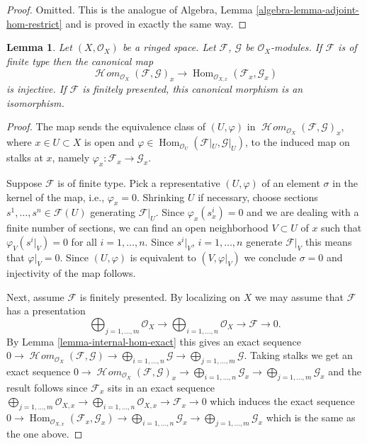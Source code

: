 \documentclass{stacks-project}
\theoremstyle{plain}
\newtheorem{lemma}[subsection]{Lemma}
\theoremstyle{definition}
\theoremstyle{remark}
\numberwithin{equation}{subsection}
\def\Hom{\mathop{\mathrm{Hom}}\nolimits}
\def\SheafHom{\mathop{\mathcal{H}\!\mathit{om}}\nolimits}
\begin{document}
\begin{proof}
Omitted. This is the analogue of
Algebra, Lemma \ref{algebra-lemma-adjoint-hom-restrict}
and is proved in exactly the same way.
\end{proof}

\begin{lemma}
\label{lemma-stalk-internal-hom}
Let $(X, \mathcal{O}_X)$ be a ringed space.
Let $\mathcal{F}$, $\mathcal{G}$ be $\mathcal{O}_X$-modules.
If $\mathcal{F}$ is of finite type then the canonical map
$$
\SheafHom_{\mathcal{O}_X}(\mathcal{F}, \mathcal{G})_x
\to
\Hom_{\mathcal{O}_{X, x}}(\mathcal{F}_x, \mathcal{G}_x)
$$
is injective.
If $\mathcal{F}$ is finitely presented,
this canonical morphism is an isomorphism.
\end{lemma}

\begin{proof}
The map sends the equivalence class of
$(U, \varphi)$ in $\SheafHom_{\mathcal{O}_X}(\mathcal{F}, \mathcal{G})_x$,
where $x \in U \subset X$ is open and
$\varphi \in \Hom_{\mathcal{O}_U}(\mathcal{F}|_U, \mathcal{G}|_U)$,
to the induced map on stalks at $x$, namely
$\varphi_x : \mathcal{F}_x \to \mathcal{G}_x$.

\medskip\noindent
Suppose $\mathcal{F}$ is of finite type.
Pick a representative $(U, \varphi)$ of an element $\sigma$
in the kernel of the map, i.e., $\varphi_x = 0$.
Shrinking $U$ if necessary, choose sections
$s^1, \ldots, s^n \in \mathcal{F}(U)$ generating $\mathcal{F}|_U$.
Since $\varphi_x(s^i_x) = 0$
and we are dealing with a finite number of sections,
we can find an open neighborhood 
$V \subset U$ of $x$ such that $\varphi_V(s^i|_V)=0$
for all $i = 1, \ldots, n$. Since $s^i|_V$, $i = 1, \ldots, n$ generate
$\mathcal{F}|_V$ this means that $\varphi|_V = 0$.
Since $(U, \varphi)$ is equivalent to $(V, \varphi|_V)$
we conclude $\sigma = 0$ and injectivity of the map follows.

\medskip\noindent
Next, assume $\mathcal{F}$ is finitely presented.
By localizing on $X$ we may assume that $\mathcal{F}$ has a presentation
$$
\bigoplus\nolimits_{j = 1, \ldots, m}
\mathcal{O}_X
\longrightarrow
\bigoplus\nolimits_{i = 1, \ldots, n}
\mathcal{O}_X
\to
\mathcal{F}
\to
0.
$$
By Lemma \ref{lemma-internal-hom-exact} this gives an exact sequence
$
0 \to
\SheafHom_{\mathcal{O}_X}(\mathcal{F}, \mathcal{G}) \to
\bigoplus\nolimits_{i = 1, \ldots, n} \mathcal{G}
\longrightarrow
\bigoplus\nolimits_{j = 1, \ldots, m} \mathcal{G}.
$
Taking stalks we get an exact sequence
$
0 \to
\SheafHom_{\mathcal{O}_X}(\mathcal{F}, \mathcal{G})_x \to
\bigoplus\nolimits_{i = 1, \ldots, n} \mathcal{G}_x
\longrightarrow
\bigoplus\nolimits_{j = 1, \ldots, m} \mathcal{G}_x
$
and the result follows since $\mathcal{F}_x$ sits in
an exact sequence
$
\bigoplus\nolimits_{j = 1, \ldots, m}
\mathcal{O}_{X, x}
\longrightarrow
\bigoplus\nolimits_{i = 1, \ldots, n}
\mathcal{O}_{X, x}
\to
\mathcal{F}_x
\to
0
$
which induces the exact sequence
$
0 \to
\Hom_{\mathcal{O}_{X, x}}(\mathcal{F}_x, \mathcal{G}_x) \to
\bigoplus\nolimits_{i = 1, \ldots, n} \mathcal{G}_x
\longrightarrow
\bigoplus\nolimits_{j = 1, \ldots, m} \mathcal{G}_x
$
which is the same as the one above.
\end{proof}
\end{document}
